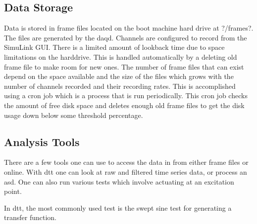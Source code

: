 \subsection{Data Storage}

Data is stored in frame files located on the boot machine hard drive at
\lstin?/frames?. The files are generated by the \ac{daqd}. Channels are
configured to record from the SimuLink GUI. There is a limited amount of
lookback time due to space limitations on the harddrive. This is handled
automatically by a deleting old frame file to make room for new ones. The
number of frame files that can exist depend on the space available and the
size of the files which grows with the number of channels recorded and their
recording rates. This is accomplished using a cron job which is a process
that is run periodically. This cron job checks the amount of free disk space
and deletes enough old frame files to get the disk usage down below some
threshold percentage.


\subsection{Analysis Tools}

There are a few tools one can use to access the data in from either frame files
or online. With \ac{dtt} one can look at raw and filtered time series data,
or process an \ac{asd}. One can also run various tests which involve actuating
at an excitation point.

In \ac{dtt}, the most commonly used test is the swept sine test for
generating a transfer function.


